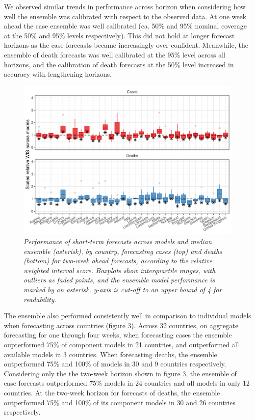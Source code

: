 \documentclass[
]{article}
\begin{document}
We observed similar trends in performance across horizon when
considering how well the ensemble was calibrated with respect to the
observed data. At one week ahead the case ensemble was well calibrated
(ca. 50\% and 95\% nominal coverage at the 50\% and 95\% levels
respectively). This did not hold at longer forecast horizons as the case
forecasts became increasingly over-confident. Meanwhile, the ensemble of
death forecasts was well calibrated at the 95\% level across all
horizons, and the calibration of death forecasts at the 50\% level
increased in accuracy with lengthening horizons.

\begin{figure}
\centering
\includegraphics{abstract-results_files/figure-latex/figure-3-1.pdf}
\caption{\emph{Performance of short-term forecasts across models and
median ensemble (asterisk), by country, forecasting cases (top) and
deaths (bottom) for two-week ahead forecasts, according to the relative
weighted interval score. Boxplots show interquartile ranges, with
outliers as faded points, and the ensemble model performance is marked
by an asterisk. y-axis is cut-off to an upper bound of 4 for
readability.}}
\end{figure}

The ensemble also performed consistently well in comparison to
individual models when forecasting across countries (figure 3). Across
32 countries, on aggregate forecasting for one through four weeks, when
forecasting cases the ensemble oupterformed 75\% of component models in
21 countries, and outperformed all available models in 3 countries. When
forecasting deaths, the ensemble outperformed 75\% and 100\% of models
in 30 and 9 countries respectively. Considering only the the two-week
horizon shown in figure 3, the ensemble of case forecasts outperformed
75\% models in 24 countries and all models in only 12 countries. At the
two-week horizon for forecasts of deaths, the ensemble outperformed 75\%
and 100\% of its component models in 30 and 26 countries respectively.
\end{document}
